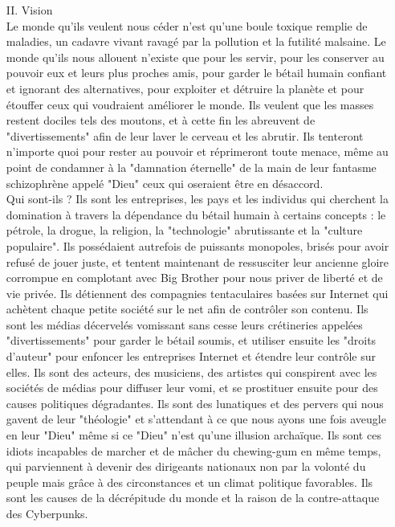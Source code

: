 \documentclass[11pt,twoside,a4paper]{book}
\begin{document}
\begin{enumerate}
		Vive la r{\'e}volution cybern{\'e}tique, vive les techno-anarchistes, vive les hackers et les crackers.
	\item[II.] Vision ~\\
		Le monde qu'ils veulent nous c{\'e}der n'est qu'une boule toxique remplie de maladies, un cadavre vivant ravag{\'e} par la pollution et la futilit{\'e} malsaine. Le monde qu'ils nous allouent n'existe que pour les servir, pour les conserver au pouvoir eux et leurs plus proches amis, pour garder le b{\'e}tail humain confiant et ignorant des alternatives, pour exploiter et d{\'e}truire la plan{\`e}te et pour {\'e}touffer ceux qui voudraient am{\'e}liorer le monde. Ils veulent que les masses restent dociles tels des moutons, et {\`a} cette fin les abreuvent de "divertissements" afin de leur laver le cerveau et les abrutir. Ils tenteront n'importe quoi pour rester au pouvoir et r{\'e}primeront toute menace, m{\^e}me au point de condamner {\`a} la "damnation {\'e}ternelle" de la main de leur fantasme schizophr{\`e}ne appel{\'e} "Dieu" ceux qui oseraient {\^e}tre en d{\'e}saccord. ~\\

		Qui sont-ils ? Ils sont les entreprises, les pays et les individus qui cherchent la domination {\`a} travers la d{\'e}pendance du b{\'e}tail humain {\`a} certains concepts : le p{\'e}trole, la drogue, la religion, la "technologie" abrutissante et la "culture populaire". Ils poss{\'e}daient autrefois de puissants monopoles, bris{\'e}s pour avoir refus{\'e} de jouer juste, et tentent maintenant de ressusciter leur ancienne gloire corrompue en complotant avec Big Brother pour nous priver de libert{\'e} et de vie priv{\'e}e. Ils d{\'e}tiennent des compagnies tentaculaires bas{\'e}es sur Internet qui ach{\`e}tent chaque petite soci{\'e}t{\'e} sur le net afin de contr{\^o}ler son contenu. Ils sont les m{\'e}dias d{\'e}cervel{\'e}s vomissant sans cesse leurs cr{\'e}tineries appel{\'e}es "divertissements" pour garder le b{\'e}tail soumis, et utiliser ensuite les "droits d'auteur" pour enfoncer les entreprises Internet et {\'e}tendre leur contr{\^o}le sur elles. Ils sont des acteurs, des musiciens, des artistes qui conspirent avec les soci{\'e}t{\'e}s de m{\'e}dias pour diffuser leur vomi, et se prostituer ensuite pour des causes politiques d{\'e}gradantes. Ils sont des lunatiques et des pervers qui nous gavent de leur "th{\'e}ologie" et s'attendant {\`a} ce que nous ayons une fois aveugle en leur "Dieu" m{\^e}me si ce "Dieu" n'est qu'une illusion archa{\"i}que. Ils sont ces idiots incapables de marcher et de m{\^a}cher du chewing-gum en m{\^e}me temps, qui parviennent {\`a} devenir des dirigeants nationaux non par la volont{\'e} du peuple mais gr{\^a}ce {\`a} des circonstances et un climat politique favorables. Ils sont les causes de la d{\'e}cr{\'e}pitude du monde et la raison de la contre-attaque des Cyberpunks. ~\\


\end{enumerate}
\end{document}
